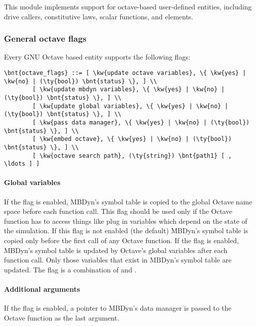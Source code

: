 \noindent
This module implements support for octave-based user-defined entities, including
drive callers, constitutive laws, scalar functions, and elements.

\subsubsection{General octave flags}
Every GNU Octave based entity supports the following flags:
\begin{Verbatim}[commandchars=\\\{\}]
    \bnt{octave_flags} ::= [ \kw{update octave variables}, \{ \kw{yes} | \kw{no} | (\ty{bool}) \bnt{status} \}, ] \\
        [ \kw{update mbdyn variables}, \{ \kw{yes} | \kw{no} | (\ty{bool}) \bnt{status} \}, ] \\
        [ \kw{update global variables}, \{ \kw{yes} | \kw{no} | (\ty{bool}) \bnt{status} \}, ] \\
        [ \kw{pass data manager}, \{ \kw{yes} | \kw{no} | (\ty{bool}) \bnt{status} \}, ] \\
        [ \kw{embed octave}, \{ \kw{yes} | \kw{no} | (\ty{bool}) \bnt{status} \}, ] \\
        [ \kw{octave search path}, (\ty{string}) \bnt{path1} [ , \ldots ] ]
\end{Verbatim}
\paragraph{Global variables}
If the flag  is enabled, MBDyn's symbol table is copied to the global Octave name space before each function call.
This flag should be used only if the Octave function has to access things like plug in variables which depend on the state of the simulation.
If this flag is not enabled (the default) MBDyn's symbol table is copied only before the first call of any Octave function.
If the flag  is enabled, MBDyn's symbol table is updated by Octave's global variables after each function call.
Only those variables that exist in MBDyn's symbol table are updated.
The flag  is a combination of  and .

\paragraph{Additional arguments}
If the flag  is enabled, a pointer to MBDyn's data manager is passed to the Octave function as the last argument.

